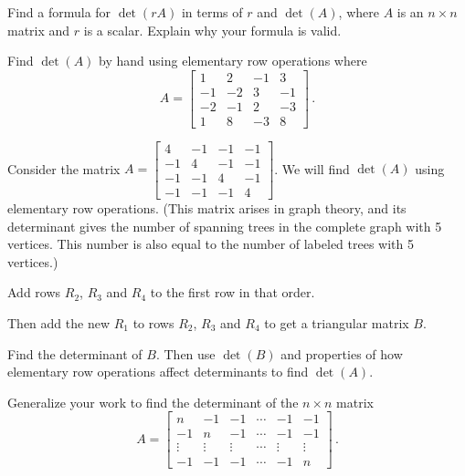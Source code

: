 \label{sec:det_prop_exer}

\be
\item \label{ex:4_f_det_multiple} Find a formula for $\det(rA)$ in terms of $r$ and $\det(A)$, where $A$ is an $n\times n$ matrix and $r$ is a scalar. Explain why your formula is valid.

\item Find $\det(A)$ by hand using elementary row operations where
\[ A= \left[ \begin{array}{rrrr} 1&2&-1&3\\ -1&-2&3&-1\\ -2&-1&2&-3\\ 1&8&-3&8 \end{array} \right] \, .\]

\item Consider the matrix $A= \left[ \begin{array}{rrrr} 4&-1&-1&-1 \\ -1&4&-1&-1\\ -1&-1&4&-1\\ -1&-1&-1&4 \end{array} \right]$. We will find $\det(A)$ using elementary row operations. (This matrix arises in graph theory, and its determinant gives the number of spanning trees in the complete graph with 5 vertices. This number is also equal to the number of labeled trees with 5 vertices.)

\ba 
\item Add rows $R_2$, $R_3$ and $R_4$ to the first row in that order.



\item Then add the new $R_1$ to rows $R_2$, $R_3$ and $R_4$ to get a triangular matrix $B$.


\item Find the determinant of $B$. Then use $\det(B)$ and properties of how elementary row operations affect determinants to find $\det(A)$.



\item Generalize your work to find the determinant of the $n\times n$ matrix
\[ A= \left[ \begin{array}{rrrrrr} n&-1&-1&\cdots &-1&-1 \\ -1&n&-1&\cdots &-1&-1\\ \vdots &\vdots &\vdots &\cdots & \vdots & \vdots\\ -1&-1&-1& \cdots&-1&n \end{array} \right] \, .\]

